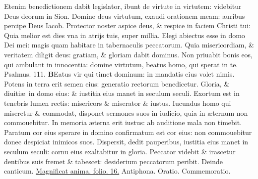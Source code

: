 \documentclass[a5paper,10pt]{book}
\def\ae{æ}
\begin{document}
\begin{multicols*}{2}
\newline \color{red} E\color{black}tenim benedictionem dabit legislator, ibunt de virtute in virtutem: videbitur Deus deorum in Sion.
\newline \color{red} D\color{black}omine deus virtutum, exaudi orationem meam: auribus percipe Deus Iacob.
\newline \color{red} P\color{black}rotector noster aspice deus, \& respice in faciem Christi tui:
\newline \color{red} Q\color{black}uia melior est dies vna in atrijs tuis, super millia.
\newline \color{red} E\color{black}legi abiectus esse in domo Dei mei: magis quam habitare in tabernaculis peccatorum.
\newline \color{red} Q\color{black}uia misericordiam, \& veritatem diligit deus: gratiam, \& gloriam dabit dominus.
\newline \color{red} N\color{black}on priuabit bonis eos, qui ambulant in innocentia: domine virtutum, beatus homo, qui sperat in te.
\newline \color{red} Psalmus. \hypertarget{ps111}{111.} \color{black}
\vspace{-.5em}
\lettrine[lines=2]{\bfseries \color{red} B}{}Eatus vir qui timet dominum: in mandatis eius volet nimis.
\newline \color{red} P\color{black}otens in terra erit semen eius: generatio rectorum benedicetur.
\newline \color{red} G\color{black}loria, \& diuiti\ae \ in domo eius: \& iustitia eius manet in seculum seculi.
\newline \color{red} E\color{black}xortum est in tenebris lumen rectis: misericors \& miserator \& iustus.
\newline \color{red} I\color{black}ucundus homo qui miseretur \& commodat, disponet sermones suos in iudicio, quia in \ae ternum non commouebitur.
\newline \color{red} I\color{black}n memoria \ae terna erit iustus: ab auditione mala non timebit.
\newline \color{red} P\color{black}aratum cor eius sperare in domino confirmatum est cor eius: non commouebitur donec despiciat inimicos suos.
\newline \color{red} D\color{black}ispersit, dedit pauperibus, iustitia eius manet in seculum seculi: cornu eius exaltabitur in gloria.
\newline \color{red} P\color{black}eccator videbit \& irascetur dentibus suis fremet \& tabescet: desiderium peccatorum peribit. \quad \color{red} Deinde canticum. \color{black} \hyperlink{Magnificat}{Magnificat anima. folio. 16.} \color{red} Antiphona. Oratio. Commemoratio. \color{black}

\end{multicols*}
\end{document}

